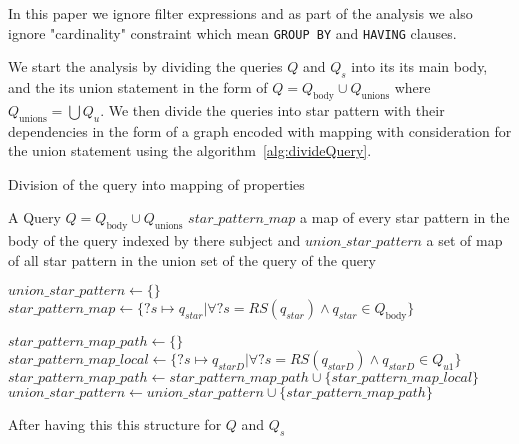 In this paper we ignore filter expressions and as part of the analysis we also ignore "cardinality" constraint 
which mean \texttt{GROUP BY} and \texttt{HAVING} clauses.


We start the analysis by dividing the queries $Q$ and $Q_s$ into its its main body, and the its union statement in the form of 
$Q = Q_{\text{body}} \cup Q_{\text{unions}}$ where $Q_{\text{unions}} = \bigcup Q_u$.
We then divide the queries into star pattern with their dependencies in the form of a graph encoded with mapping with consideration for the union statement using the algorithm~\ref{alg:divideQuery}.

\begin{algorithm}
   \caption{Division of the query into mapping of properties}\label{alg:divideQuery}
   \begin{algorithmic}
      \REQUIRE A Query $Q = Q_{\text{body}} \cup Q_{\text{unions}}$
      \ENSURE $star\_pattern\_map$ a map of every star pattern in the body of the query indexed by there subject and $union\_star\_pattern$ a set of map of all star pattern in the union set of the query of the query

      \STATE $union\_star\_pattern \leftarrow \{\}$
      \STATE $star\_pattern\_map \leftarrow \{ ?s \mapsto q_{star}| \forall ?s = RS(q_{star}) \land q_{star} \in Q_{\text{body}} \}$ %

         \STATE $star\_pattern\_map\_path \leftarrow \{\}$ %
            \STATE $star\_pattern\_map\_local \leftarrow \{ ?s \mapsto q_{starD}| \forall ?s = RS(q_{starD}) \land q_{starD} \in Q_{u1} \}$ %
            \STATE $star\_pattern\_map\_path \leftarrow star\_pattern\_map\_path \cup \{star\_pattern\_map\_local\}$ 
         \ENDFOR
        \STATE $union\_star\_pattern \leftarrow union\_star\_pattern \cup \{ star\_pattern\_map\_path \}$
      \ENDFOR
   \end{algorithmic}
\end{algorithm}

After having this this structure for $Q$ and $Q_s$

